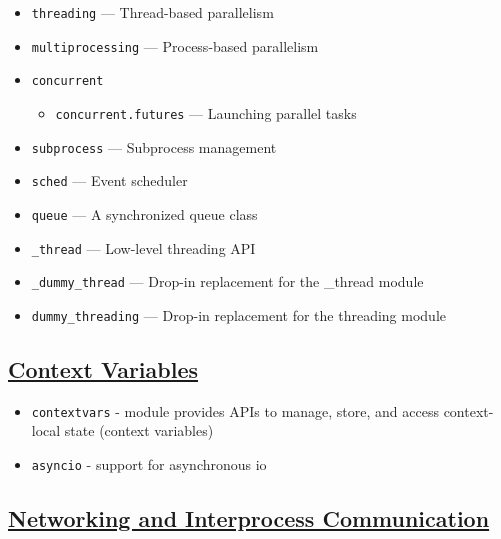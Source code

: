 \documentclass[]{book}
\providecommand{\tightlist}{%
  \setlength{\itemsep}{0pt}\setlength{\parskip}{0pt}}
\theoremstyle{definition}
\theoremstyle{definition}
\theoremstyle{definition}
\theoremstyle{remark}
\begin{document}
\begin{itemize}
\tightlist
\item
  \texttt{threading} --- Thread-based parallelism
\item
  \texttt{multiprocessing} --- Process-based parallelism
\item
  \texttt{concurrent}

  \begin{itemize}
  \tightlist
  \item
    \texttt{concurrent.futures} --- Launching parallel tasks
  \end{itemize}
\item
  \texttt{subprocess} --- Subprocess management
\item
  \texttt{sched} --- Event scheduler
\item
  \texttt{queue} --- A synchronized queue class
\item
  \texttt{\_thread} --- Low-level threading API
\item
  \texttt{\_dummy\_thread} --- Drop-in replacement for the \_thread
  module
\item
  \texttt{dummy\_threading} --- Drop-in replacement for the threading
  module
\end{itemize}

\subsection{\texorpdfstring{\href{https://docs.python.org/3.7/library/contextvars.html\#module-contextvars}{Context
Variables}}{Context Variables}}\label{context-variables}

\begin{itemize}
\tightlist
\item
  \texttt{contextvars} - module provides APIs to manage, store, and
  access context-local state (context variables)
\item
  \texttt{asyncio} - support for asynchronous io
\end{itemize}

\subsection{\texorpdfstring{\href{https://docs.python.org/3.7/library/ipc.html}{Networking
and Interprocess
Communication}}{Networking and Interprocess Communication}}\label{networking-and-interprocess-communication}
\end{document}
